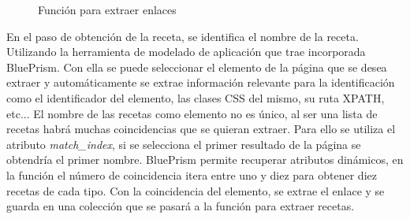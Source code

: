 \begin{figure}[h!]
    \centering
    \caption{Función para extraer enlaces}
    \label{fig:links}
\end{figure}

En el paso de obtención de la receta, se identifica el nombre de la receta. Utilizando la herramienta de modelado de aplicación que trae incorporada BluePrism. Con ella se puede seleccionar el elemento de la página que se desea extraer y automáticamente se extrae información relevante para la identificación como el identificador del elemento, las clases CSS del mismo, su ruta XPATH, etc... El nombre de las recetas como elemento no es único, al ser una lista de recetas habrá muchas coincidencias que se quieran extraer. Para ello se utiliza el atributo \emph{match_index}, si se selecciona el primer resultado de la página se obtendría el primer nombre. BluePrism permite recuperar atributos dinámicos, en la función el número de coincidencia itera entre uno y diez para obtener diez recetas de cada tipo. Con la coincidencia del elemento, se extrae el enlace y se guarda en una colección que se pasará a la función para extraer recetas. 

